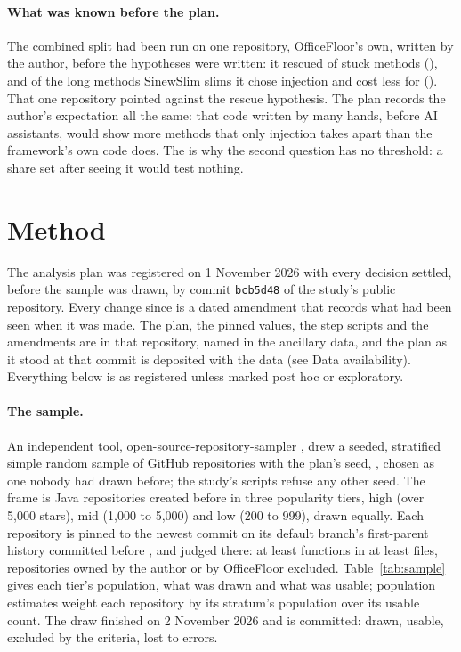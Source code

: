 \documentclass[11pt,a4paper]{article}
\newcommand{\sig}[1]{\texttt{#1}}
\newcommand{\regCommit}{bcb5d48}
\begin{document}
\paragraph{What was known before the plan.} The combined split had been run
on one repository, OfficeFloor's own, written by the author, before the
hypotheses were written: it rescued \priorCatThree{} of \priorStuck{} stuck
methods (\priorCatThreeShare{}), and of the \priorSlimmed{} long methods
SinewSlim slims it chose injection and cost less for \priorImproved{}
(\priorImprovedShare{}). That one repository pointed against the rescue
hypothesis. The plan records the author's expectation all the same: that
code written by many hands, before AI assistants, would show more methods
that only injection takes apart than the framework's own code does. The
\priorImprovedShare{} is why the second question has no threshold: a share
set after seeing it would test nothing.

\section{Method}

The analysis plan was registered on 1 November 2026 with every decision
settled, before the sample was drawn, by commit \sig{\regCommit} of the
study's public repository. Every change since is a dated amendment that
records what had been seen when it was made. The plan, the pinned values,
the step scripts and the amendments are in that repository, named in the
ancillary data, and the plan as it stood at that commit is deposited with the
data (see Data availability). Everything below is as registered unless
marked post hoc or exploratory.

\paragraph{The sample.} An independent tool, open-source-repository-sampler
\samplerVersion{}, drew a seeded, stratified simple random sample of GitHub
repositories with the plan's seed, \planSeed{}, chosen as one nobody had
drawn before; the study's scripts refuse any other seed. The frame is Java
repositories created before \planAsOf{} in three popularity tiers, high (over
5{,}000 stars), mid (1{,}000 to 5{,}000) and low (200 to 999), drawn equally.
Each repository is pinned to the newest commit on its default branch's
first-parent history committed before \planAsOf{}, and judged there: at least
\planMinFunctions{} functions in at least \planMinFiles{} files, repositories
owned by the author or by OfficeFloor excluded. Table~\ref{tab:sample} gives
each tier's population, what was drawn and what was usable; population
estimates weight each repository by its stratum's population over its usable
count. The draw finished on 2 November 2026 and is committed: \nDrawn{} drawn,
\nUsable{} usable, \nExcluded{} excluded by the criteria, \nError{} lost to
errors.
\end{document}
